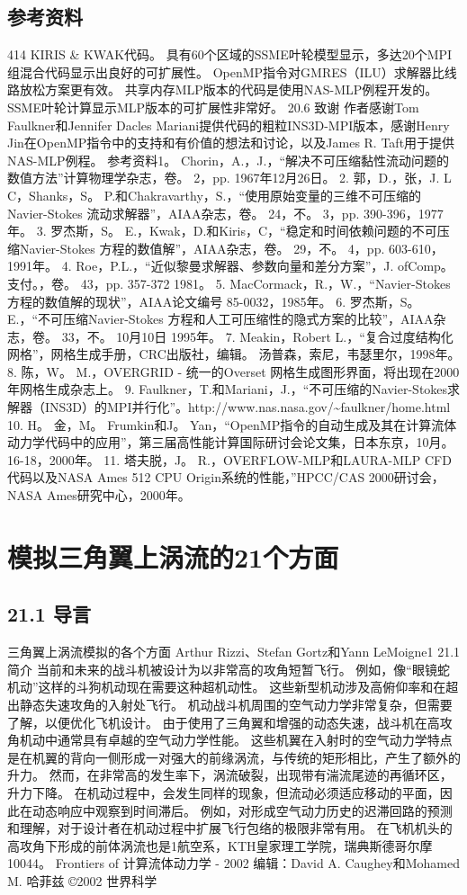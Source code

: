 \documentclass[UTF8,11pt,a4paper,openany,fontset=fandol]{ctexbook}
\begin{document}
\section{参考资料}
414 KIRIS \& KWAK代码。 具有60个区域的SSME叶轮模型显示，多达20个MPI组混合代码显示出良好的可扩展性。 OpenMP指令对GMRES（ILU）求解器比线路放松方案更有效。 共享内存MLP版本的代码是使用NAS-MLP例程开发的。 SSME叶轮计算显示MLP版本的可扩展性非常好。 20.6 致谢 作者感谢Tom Faulkner和Jennifer Dacles Mariani提供代码的粗粒INS3D-MPI版本，感谢Henry Jin在OpenMP指令中的支持和有价值的想法和讨论，以及James R. Taft用于提供NAS-MLP例程。 参考资料1。 Chorin，A.，J.，“解决不可压缩黏性流动问题的数值方法”计算物理学杂志，卷。 2，pp. 1967年12月26日。 2. 郭，D.，张，J. L C，Shanks，S。 P.和Chakravarthy，S.，“使用原始变量的三维不可压缩的Navier-Stokes 流动求解器”，AIAA杂志，卷。 24，不。 3，pp. 390-396，1977年。 3. 罗杰斯，S。 E.，Kwak，D.和Kiris，C，“稳定和时间依赖问题的不可压缩Navier-Stokes 方程的数值解”，AIAA杂志，卷。 29，不。 4，pp. 603-610，1991年。 4. Roe，P.L.，“近似黎曼求解器、参数向量和差分方案”，J. ofComp。 支付。，卷。 43，pp. 357-372 1981。 5. MacCormack，R.，W.，“Navier-Stokes方程的数值解的现状”，AIAA论文编号 85-0032，1985年。 6. 罗杰斯，S。 E.，“不可压缩Navier-Stokes 方程和人工可压缩性的隐式方案的比较”，AIAA杂志，卷。 33，不。 10月10日 1995年。 7. Meakin，Robert L.，“复合过度结构化网格”，网格生成手册，CRC出版社，编辑。 汤普森，索尼，韦瑟里尔，1998年。 8. 陈，W。 M.，OVERGRID - 统一的Overset 网格生成图形界面，将出现在2000年网格生成杂志上。 9. Faulkner，T.和Mariani，J.，“不可压缩的Navier-Stokes求解器（INS3D）的MPI并行化”。http://www.nas.nasa.gov/\textasciitilde{}faulkner/home.html 10. H。 金，M。 Frumkin和J。 Yan，“OpenMP指令的自动生成及其在计算流体动力学代码中的应用”，第三届高性能计算国际研讨会论文集，日本东京，10月。 16-18，2000年。 11. 塔夫脱，J。 R.，OVERFLOW-MLP和LAURA-MLP CFD代码以及NASA Ames 512 CPU Origin系统的性能，”HPCC/CAS 2000研讨会，NASA Ames研究中心，2000年。

\clearpage
\chapter{模拟三角翼上涡流的21个方面}
\section{21.1 导言}
三角翼上涡流模拟的各个方面 Arthur Rizzi、Stefan Gortz和Yann LeMoigne1 21.1 简介 当前和未来的战斗机被设计为以非常高的攻角短暂飞行。 例如，像“眼镜蛇机动”这样的斗狗机动现在需要这种超机动性。 这些新型机动涉及高俯仰率和在超出静态失速攻角的入射处飞行。 机动战斗机周围的空气动力学非常复杂，但需要了解，以便优化飞机设计。 由于使用了三角翼和增强的动态失速，战斗机在高攻角机动中通常具有卓越的空气动力学性能。 这些机翼在入射时的空气动力学特点是在机翼的背向一侧形成一对强大的前缘涡流，与传统的矩形相比，产生了额外的升力。 然而，在非常高的发生率下，涡流破裂，出现带有湍流尾迹的再循环区，升力下降。 在机动过程中，会发生同样的现象，但流动必须适应移动的平面，因此在动态响应中观察到时间滞后。 例如，对形成空气动力历史的迟滞回路的预测和理解，对于设计者在机动过程中扩展飞行包络的极限非常有用。 在飞机机头的高攻角下形成的前体涡流也是1航空系，KTH皇家理工学院，瑞典斯德哥尔摩10044。 Frontiers of 计算流体动力学 - 2002 编辑：David A. Caughey和Mohamed M. 哈菲兹 ©2002 世界科学
\end{document}
